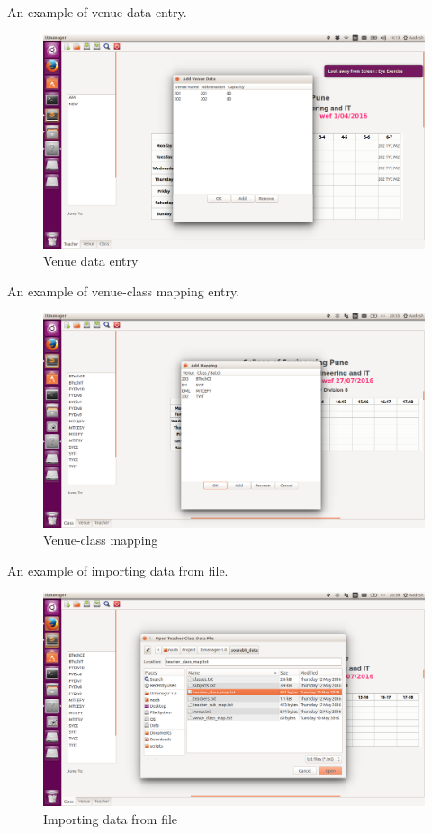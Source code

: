 An example of venue data entry.
\begin{figure}[ht!]
	\centering
	\includegraphics[width=160mm]{6.png}
	\caption{Venue data entry}
\end{figure}

\newpage
An example of venue-class mapping entry.
\begin{figure}[ht!]
	\centering
	\includegraphics[width=160mm]{mapping.png}
	\caption{Venue-class mapping }
\end{figure}

An example of importing data from file.
\begin{figure}[ht!]
	\centering
	 \includegraphics[width=160mm]{import_file.png}
	\caption{Importing data from file}
\end{figure}

